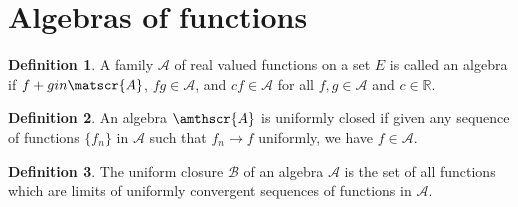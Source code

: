 \documentclass[11pt]{article}
\def\R{\mathbb{R}}
\theoremstyle{definition}
\newtheorem{definition}{Definition}[section]
\theoremstyle{remark}
\begin{document}
    \section{Algebras of functions}
    \begin{definition}
        A family $\mathscr{A}$ of real valued functions on a set $E$ is called an
        algebra if $f + g \\in \matscr{A}$, $fg \in \mathscr{A}$, and $cf \in
        \mathscr{A}$ for all $f, g\in \mathscr{A}$ and $c \in \R$.
    \end{definition}

    \begin{definition}
        An algebra $\amthscr{A}$ is uniformly closed if given any sequence of
        functions $\{f_n\}$ in $\mathscr{A}$ such that $f_n \to f$ uniformly, we have
        $f \in \mathscr{A}$.
    \end{definition}

    \begin{definition}
        The uniform closure $\mathscr{B}$ of an algebra $\mathscr{A}$ is the set of
        all functions which are limits of uniformly convergent sequences of functions
        in $\mathscr{A}$.
    \end{definition}
\end{document}
